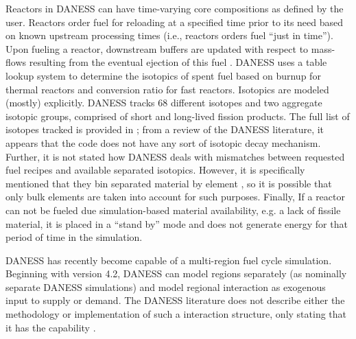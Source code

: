 Reactors in DANESS can have time-varying core compositions as defined by the
user. Reactors order fuel for reloading at a specified time prior to its need
based on known upstream processing times (i.e., reactors orders fuel ``just in
time''). Upon fueling a reactor, downstream buffers are updated with respect to
mass-flows resulting from the eventual ejection of this fuel
\cite{guerin_benchmark_2009}. DANESS uses a table lookup system to determine the
isotopics of spent fuel based on burnup for thermal reactors and conversion
ratio for fast reactors. Isotopics are modeled (mostly) explicitly. DANESS
tracks 68 different isotopes and two aggregate isotopic groups, comprised of
short and long-lived fission products. The full list of isotopes tracked is
provided in \cite{van_den_durpel_daness_2009}; from a review of the DANESS
literature, it appears that the code does not have any sort of isotopic decay
mechanism. Further, it is not stated how DANESS deals with mismatches between
requested fuel recipes and available separated isotopics. However, it is
specifically mentioned that they bin separated material by element
\cite{van_den_durpel_daness_2009}, so it is possible that only bulk elements are
taken into account for such purposes. Finally, If a reactor can not be fueled
due simulation-based material availability, e.g. a lack of fissile material, it
is placed in a ``stand by'' mode and does not generate energy for that period of
time in the simulation.

DANESS has recently become capable of a multi-region fuel cycle simulation.
Beginning with version 4.2, DANESS can model regions separately (as nominally
separate DANESS simulations) and model regional interaction as exogenous input
to supply or demand. The DANESS literature does not describe either the
methodology or implementation of such a interaction structure, only stating that
it has the capability \cite{van_den_durpel_daness_2009}.
